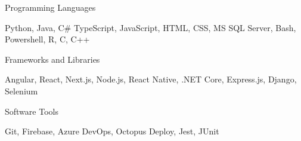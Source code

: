 



\begin{cvskills}    
      
      
\cvskill
    {Programming Languages}
    {\begin{minipage}[t]{0.7\textwidth}
       Python, Java, C\# TypeScript, JavaScript, HTML, CSS, MS SQL Server, Bash, Powershell, R, C, C++
    \end{minipage}
    }
    
\cvskill
    {Frameworks and Libraries}
    {\begin{minipage}[t]{0.7\textwidth}
       Angular, React, Next.js, Node.js, React Native, .NET Core, Express.js, Django, Selenium
    \end{minipage}
    }
    

\cvskill
    {Software Tools}
    {\begin{minipage}[t]{0.7\textwidth}
       Git, Firebase, Azure DevOps, Octopus Deploy, Jest, JUnit
    \end{minipage}
    }

    
\end{cvskills}  


